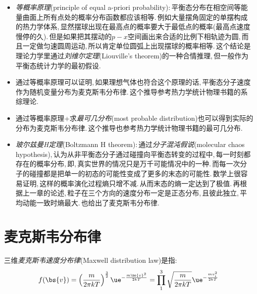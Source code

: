 \begin{itemize}
	\item \emph{等概率原理}(principle of equal a-priori probability):\,平衡态分布在相空间等能量曲面上所有点处的概率分布函数都应该相等.\,例如大量摆角固定的单摆构成的热力学体系,\,显然摆球出现在最高点的概率要大于最低点的概率(最高点速度慢停的久).\,但是如果把其摆动的$p-x$空间画出来合适的比例下相轨迹为圆,\,而且一定做匀速圆周运动,\,所以肯定单位圆弧上出现摆球的概率相等.\,这个结论是理论力学里通过\emph{刘维尔定理}(Liouville's theorem)的一种合情推理,\,但一般作为平衡态统计力学的最初假设.

	\item 通过等概率原理可以证明,\,如果理想气体也符合这个原理的话,\,平衡态分子速度作为随机变量分布为麦克斯韦分布律.\,这个推导参考热力学统计物理书籍的系综理论.
	\item 通过等概率原理+求\emph{最可几分布}(most probable distribution)也可以得到实际的分布为麦克斯韦分布律.\,这个推导也参考热力学统计物理书籍的最可几分布.
	\item \emph{玻尔兹曼H定理}(Boltzmann H theorem):\,通过\emph{分子混沌假说}(molecular chaos hypothesis),\,认为从非平衡态分子通过碰撞向平衡态转变的过程中,\,每一时刻都存在的概率分布,\,即,\,真实世界的情况只是万千可能情况中的一种.\,而每一次分子的碰撞都是把单一的初态的可能性变成了更多的末态的可能性.\,数学上很容易证明,\,这样的概率演化过程熵只增不减.\,从而末态的熵一定达到了极值.\,再根据上一章的论述,\,粒子在三个方向的速度分布一定是正态分布,\,且彼此独立,\,平均动能一致时熵最大.\,也给出了麦克斯韦分布律.
\end{itemize}


\section{麦克斯韦分布律}

三维\emph{麦克斯韦速度分布律}(Maxwell distribution law)是指:
\[f(\bs{v})=\left(\frac{m}{2\pi kT}\right)^\frac{3}{2}\ue^{-\frac{m\bs{v}^2}{2kT}}=\prod_1^3 \sqrt{\frac{m}{2\pi kT}}\ue^{-\frac{mv_i^2}{2kT}}\]

